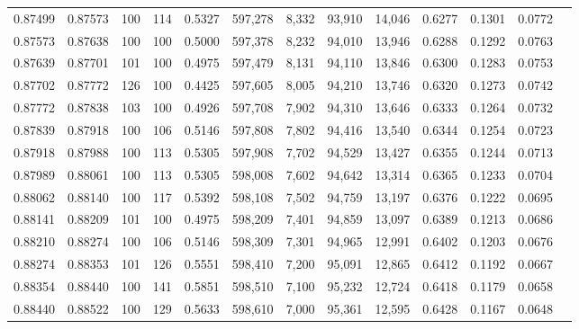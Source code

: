 \begin{tabular}{rrrrrrrrrrrrr}
0.87499 & 0.87573 &   100 & 114 &                                     0.5327 & 597,278 &   8,332 &  93,910 &  14,046 & 0.6277 & 0.1301 & 0.0772 \\
0.87573 & 0.87638 &   100 & 100 &                                     0.5000 & 597,378 &   8,232 &  94,010 &  13,946 & 0.6288 & 0.1292 & 0.0763 \\
0.87639 & 0.87701 &   101 & 100 &                                     0.4975 & 597,479 &   8,131 &  94,110 &  13,846 & 0.6300 & 0.1283 & 0.0753 \\
0.87702 & 0.87772 &   126 & 100 &                                     0.4425 & 597,605 &   8,005 &  94,210 &  13,746 & 0.6320 & 0.1273 & 0.0742 \\
0.87772 & 0.87838 &   103 & 100 &                                     0.4926 & 597,708 &   7,902 &  94,310 &  13,646 & 0.6333 & 0.1264 & 0.0732 \\
0.87839 & 0.87918 &   100 & 106 &                                     0.5146 & 597,808 &   7,802 &  94,416 &  13,540 & 0.6344 & 0.1254 & 0.0723 \\
0.87918 & 0.87988 &   100 & 113 &                                     0.5305 & 597,908 &   7,702 &  94,529 &  13,427 & 0.6355 & 0.1244 & 0.0713 \\
0.87989 & 0.88061 &   100 & 113 &                                     0.5305 & 598,008 &   7,602 &  94,642 &  13,314 & 0.6365 & 0.1233 & 0.0704 \\
0.88062 & 0.88140 &   100 & 117 &                                     0.5392 & 598,108 &   7,502 &  94,759 &  13,197 & 0.6376 & 0.1222 & 0.0695 \\
0.88141 & 0.88209 &   101 & 100 &                                     0.4975 & 598,209 &   7,401 &  94,859 &  13,097 & 0.6389 & 0.1213 & 0.0686 \\
0.88210 & 0.88274 &   100 & 106 &                                     0.5146 & 598,309 &   7,301 &  94,965 &  12,991 & 0.6402 & 0.1203 & 0.0676 \\
0.88274 & 0.88353 &   101 & 126 &                                     0.5551 & 598,410 &   7,200 &  95,091 &  12,865 & 0.6412 & 0.1192 & 0.0667 \\
0.88354 & 0.88440 &   100 & 141 &                                     0.5851 & 598,510 &   7,100 &  95,232 &  12,724 & 0.6418 & 0.1179 & 0.0658 \\
0.88440 & 0.88522 &   100 & 129 &                                     0.5633 & 598,610 &   7,000 &  95,361 &  12,595 & 0.6428 & 0.1167 & 0.0648 \\

\end{tabular}
